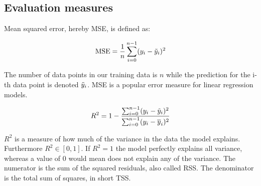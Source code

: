 \subsection{Evaluation measures}

Mean squared error, hereby MSE, is defined as: 

\begin{equation}\label{mse}
    \text{MSE} = \frac{1}{n}\sum_{i=0}^{n-1}(y_i-\Tilde{y}_i)^2
\end{equation}

The number of data points in our training data is $n$ while the prediction for the i-th data point is denoted $\Tilde{y}_i$. MSE is a popular  error measure for linear regression models. 

\begin{equation}
    R^2 = 1 - \frac{\sum_{i=0}^{n-1}(y_i-\Tilde{y}_i)^2}{\sum_{i=0}^{n-1}(y_i-\overline{y}_i)^2}
\end{equation}

$R^2$ is a measure of how much of the variance in the data the model explains.  Furthermore $R^2 \in [0,1]$. If $R^2 = 1$ the model perfectly explains all variance, whereas a value of 0 would mean does not explain any of the variance. The numerator is the sum of the squared residuals, also called RSS. The denominator is the total sum of squares, in short TSS. 

